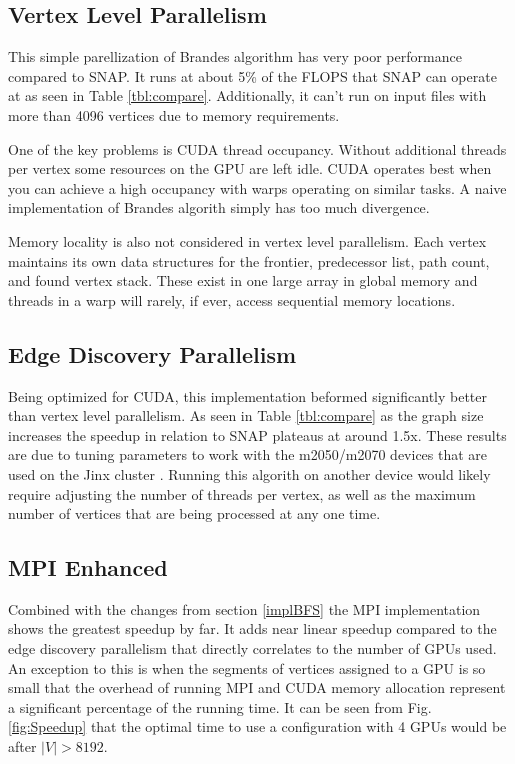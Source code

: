 \documentclass[10pt,twocolumn]{article}
\begin{document}
\subsection{Vertex Level Parallelism}
This simple parellization of Brandes algorithm has very poor performance compared to SNAP. It runs at about 5\% of the FLOPS that SNAP can operate at as seen in Table \ref{tbl:compare}. Additionally, it can't run on input files with more than 4096 vertices due to memory requirements.

One of the key problems is CUDA thread occupancy. Without additional threads per vertex some resources on the GPU are left idle. CUDA operates best when you can achieve a high occupancy with warps operating on similar tasks. A naive implementation of Brandes algorith simply has too much divergence.

Memory locality is also not considered in vertex level parallelism. Each vertex maintains its own data structures for the frontier, predecessor list, path count, and found vertex stack. These exist in one large array in global memory and threads in a warp will rarely, if ever, access sequential memory locations.

\subsection{Edge Discovery Parallelism}
Being optimized for CUDA, this implementation beformed significantly better than vertex level parallelism. As seen in Table \ref{tbl:compare} as the graph size increases the speedup in relation to SNAP plateaus at around 1.5x. These results are due to tuning parameters to work with the m2050/m2070 devices that are used on the Jinx cluster \cite{jinx}. Running this algorith on another device would likely require adjusting the number of threads per vertex, as well as the maximum number of vertices that are being processed at any one time.

\subsection{MPI Enhanced}
Combined with the changes from section \ref{implBFS} the MPI implementation shows the greatest speedup by far. It adds near linear speedup compared to the edge discovery parallelism that directly correlates to the number of GPUs used. An exception to this is when the segments of vertices assigned to a GPU is so small that the overhead of running MPI and CUDA memory allocation represent a significant percentage of the running time. It can be seen from Fig. \ref{fig:Speedup} that the optimal time to use a configuration with 4 GPUs would be after $|V| > 8192$.
\end{document}
